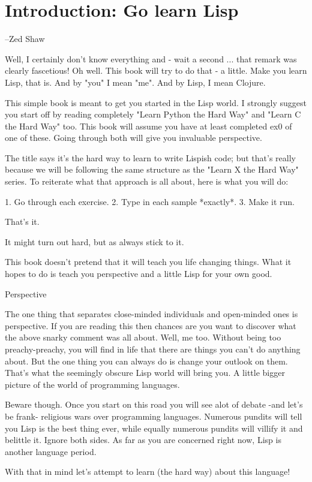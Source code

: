 \chapter{Introduction: Go learn Lisp}

--Zed Shaw

Well, I certainly don't know everything and - wait a second ... that remark was clearly fascetious! Oh well. This book will try to do that - a little. Make you learn Lisp, that is. And by "you" I mean "me". And by Lisp, I mean Clojure.

This simple book is meant to get you started in the Lisp world. I strongly suggest you start off by reading completely "Learn Python the Hard Way" and "Learn C the Hard Way" too. This book will assume you have at least completed ex0 of one of these. Going through both will give you invaluable perspective. 

The title says it's the hard way to learn to write Lispish code; but that's really because we will be following the same structure as the "Learn X the Hard Way" series. To reiterate what that approach is all about, here is what you will do:

1. Go through each exercise.
2. Type in each sample *exactly*.
3. Make it run.

That's it.  

It might turn out hard, but as always stick to it.

This book doesn't pretend that it will teach you life changing things. What it hopes to do is teach you perspective and a little Lisp for your own good.

Perspective

The one thing that separates close-minded individuals and open-minded ones is perspective. If you are reading this then chances are you want to discover what the above snarky comment was all about. Well, me too. Without being too preachy-preachy, you will find in life that there are things you can't do anything about. But the one thing you can always do is change your outlook on them. That's what the seemingly obscure Lisp world will bring you. A little bigger picture of the world of programming languages.

Beware though. Once you start on this road you will see alot of debate -and let's be frank- religious wars over programming languages. Numerous pundits will tell you Lisp is the best thing ever, while equally numerous pundits will villify it and belittle it. Ignore both sides. As far as you are concerned right now, Lisp is another language period.

With that in mind let's attempt to learn (the hard way) about this language! 